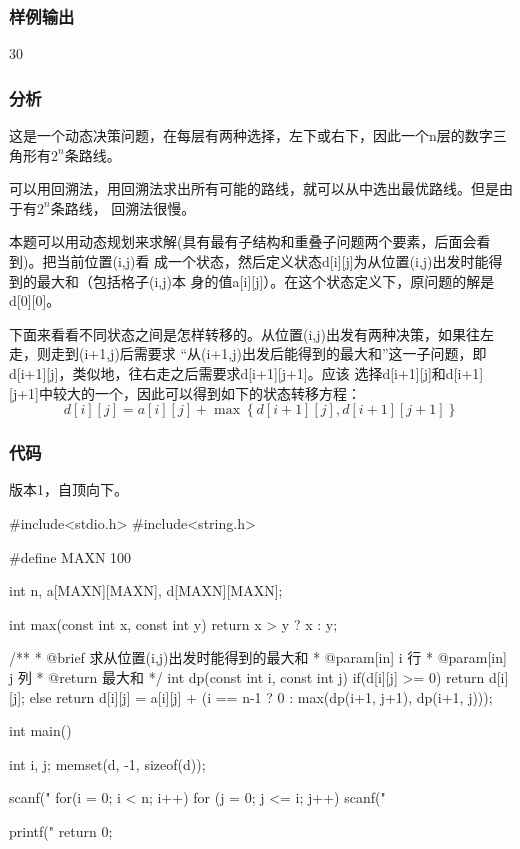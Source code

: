 \subsubsection{样例输出}
\begin{Code}
30
\end{Code}

\subsubsection{分析}
这是一个动态决策问题，在每层有两种选择，左下或右下，因此一个n层的数字三角形有$2^n$条路线。

可以用回溯法，用回溯法求出所有可能的路线，就可以从中选出最优路线。但是由于有$2^n$条路线，
回溯法很慢。

本题可以用动态规划来求解(具有最有子结构和重叠子问题两个要素，后面会看到)。把当前位置(i,j)看
成一个状态，然后定义状态d[i][j]为从位置(i,j)出发时能得到的最大和（包括格子(i,j)本
身的值a[i][j]）。在这个状态定义下，原问题的解是d[0][0]。

下面来看看不同状态之间是怎样转移的。从位置(i,j)出发有两种决策，如果往左走，则走到(i+1,j)后需要求
“从(i+1,j)出发后能得到的最大和”这一子问题，即d[i+1][j]，类似地，往右走之后需要求d[i+1][j+1]。应该
选择d[i+1][j]和d[i+1][j+1]中较大的一个，因此可以得到如下的状态转移方程：
$$d[i][j]=a[i][j]+\max\left\{d[i+1][j], d[i+1][j+1]\right\}$$

\subsubsection{代码}
版本1，自顶向下。

\begin{Codex}[label=numbers_triangle1.c]
#include<stdio.h>
#include<string.h>

#define MAXN 100

int n, a[MAXN][MAXN], d[MAXN][MAXN];

int max(const int x, const int y) {
    return x > y ? x : y;
}

/**
 * @brief 求从位置(i,j)出发时能得到的最大和
 * @param[in] i 行
 * @param[in] j 列
 * @return 最大和
 */
int dp(const int i, const int j) {
    if(d[i][j] >= 0) {
        return d[i][j];
    } else {
        return d[i][j] = a[i][j] + (i == n-1 ? 0 : max(dp(i+1, j+1), dp(i+1, j)));
    }
}

int main() {
    int i, j;
    memset(d, -1, sizeof(d));

    scanf("%
    for(i = 0; i < n; i++)
      for (j = 0; j <= i; j++) scanf("%
    
    printf("%
    return 0;
}
\end{Codex}

